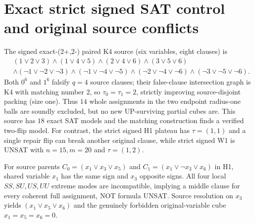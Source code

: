 \documentclass[10pt]{article}
\begin{document}
\section{Exact strict signed SAT control and original source conflicts}
The signed exact-(2+,2-) paired K4 source (six variables, eight clauses) is
\[
\begin{split}
&(1\vee2\vee3)\wedge(1\vee4\vee5)\wedge(2\vee4\vee6)\wedge(3\vee5\vee6)\\
&\wedge(\neg1\vee\neg2\vee\neg3)\wedge(\neg1\vee\neg4\vee\neg5)
\wedge(\neg2\vee\neg4\vee\neg6)\wedge(\neg3\vee\neg5\vee\neg6).
\end{split}
\]
Both $0^6$ and $1^6$ falsify $q=4$ source clauses; their false-clause intersection graph is K4 with matching number $2$, so $\tau_0=\tau_1=2$, strictly improving source-disjoint packing (size one). Thus $14$ whole assignments in the two endpoint radius-one balls are soundly excluded, but no new UP-surviving partial cubes are. This source has $18$ exact SAT models and the matching construction finds a verified two-flip model. For contrast, the strict signed H1 plateau has $\tau=(1,1)$ and a single repair flip can break another original clause, while strict signed W1 is UNSAT with $n=15,m=20$ and $\tau=(1,2)$.

For source parents $C_0=(x_1\vee x_3\vee x_5)$ and $C_1=(x_1\vee\neg x_3\vee x_6)$ in H1, shared variable $x_1$ has the same sign and $x_3$ opposite signs. All four local $SS,SU,US,UU$ extreme modes are incompatible, implying a middle clause for every coherent full assignment, NOT formula UNSAT. Source resolution on $x_3$ yields $(x_1\vee x_5\vee x_6)$ and the genuinely forbidden original-variable cube $x_1=x_5=x_6=0$.
\end{document}
